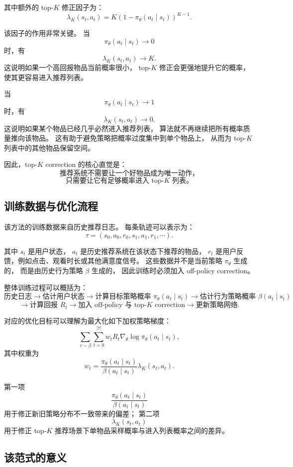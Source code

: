 \documentclass[11pt]{ctexart}
\begin{document}
其中额外的 top-$K$ 修正因子为：
\[
\lambda_K(s_t,a_t)
=
K
\left(
1-\pi_{\theta}(a_t\mid s_t)
\right)^{K-1}.
\]

该因子的作用非常关键。
当
\[
\pi_{\theta}(a_t\mid s_t)\rightarrow 0
\]
时，有
\[
\lambda_K(s_t,a_t)\rightarrow K.
\]
这说明如果一个高回报物品当前概率很小，
top-$K$ 修正会更强地提升它的概率，
使其更容易进入推荐列表。

当
\[
\pi_{\theta}(a_t\mid s_t)\rightarrow 1
\]
时，有
\[
\lambda_K(s_t,a_t)\rightarrow 0.
\]
这说明如果某个物品已经几乎必然进入推荐列表，
算法就不再继续把所有概率质量推向该物品。
这有助于避免策略把概率过度集中到单个物品上，
从而为 top-$K$ 列表中的其他物品保留空间。

因此，top-$K$ correction 的核心直觉是：
\[
\text{推荐系统不需要让一个好物品成为唯一动作，}
\]
\[
\text{只需要让它有足够概率进入 top-}K\text{ 列表。}
\]

\subsection{训练数据与优化流程}

该方法的训练数据来自历史推荐日志。
每条轨迹可以表示为：
\[
\tau=(s_0,a_0,r_0,s_1,a_1,r_1,\cdots).
\]

其中 $s_t$ 是用户状态，
$a_t$ 是历史推荐系统在该状态下推荐的物品，
$r_t$ 是用户反馈，例如点击、观看时长或其他满意度信号。
这些数据并不是当前策略 $\pi_{\theta}$ 生成的，
而是由历史行为策略 $\beta$ 生成的，
因此训练时必须加入 off-policy correction。

整体训练过程可以概括为：
\[
\text{历史日志}
\rightarrow
\text{估计用户状态}
\rightarrow
\text{计算目标策略概率 } \pi_{\theta}(a_t\mid s_t)
\rightarrow
\text{估计行为策略概率 } \beta(a_t\mid s_t)
\]
\[
\rightarrow
\text{计算回报 } R_t
\rightarrow
\text{加入 off-policy 与 top-}K\text{ correction}
\rightarrow
\text{更新策略网络}.
\]

对应的优化目标可以理解为最大化如下加权策略梯度：
\[
\sum_{\tau\sim \beta}
\sum_{t=0}^{|\tau|}
w_t
R_t
\nabla_{\theta}
\log \pi_{\theta}(a_t\mid s_t),
\]
其中权重为
\[
w_t
=
\frac{
\pi_{\theta}(a_t\mid s_t)
}{
\beta(a_t\mid s_t)
}
\lambda_K(s_t,a_t).
\]

第一项
\[
\frac{
\pi_{\theta}(a_t\mid s_t)
}{
\beta(a_t\mid s_t)
}
\]
用于修正新旧策略分布不一致带来的偏差；
第二项
\[
\lambda_K(s_t,a_t)
\]
用于修正 top-$K$ 推荐场景下单物品采样概率与进入列表概率之间的差异。

\subsection{该范式的意义}
\end{document}
